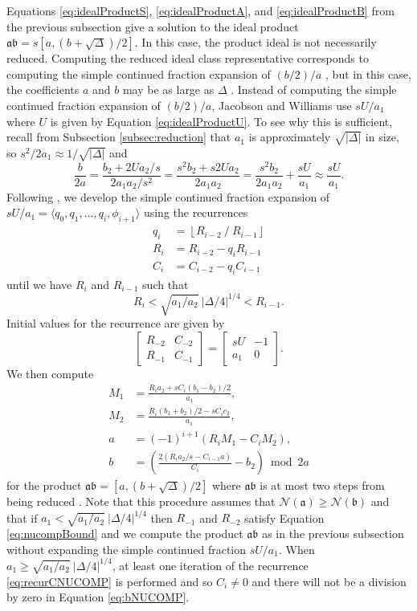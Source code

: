 \documentclass{ucalgthes1}
\theoremstyle{definition}
\newcommand{\matrixtt}[4]{\left[ \begin{array}{rr} #1 & #2 \\ #3 & #4 \end{array} \right]}
\newcommand{\floor}[1]{\left\lfloor #1 \right\rfloor}
\newcommand{\ideal}{\mathfrak}
\begin{document}
Equations \ref{eq:idealProductS}, \ref{eq:idealProductA}, and \ref{eq:idealProductB} from the previous subsection give a solution to the ideal product $\ideal a \ideal b = s[a, (b+\sqrt\Delta)/2]$.  In this case, the product ideal is not necessarily reduced.  Computing the reduced ideal class representative corresponds to computing the simple continued fraction expansion of $(b/2)/a$ \cite[p.119]{Jacobson2009}, but in this case, the coefficients $a$ and $b$ may be as large as $\Delta$ \cite[p.118]{Jacobson2009}.  Instead of computing the simple continued fraction expansion of $(b/2)/a$, Jacobson and Williams \cite[p.119]{Jacobson2009} use $sU/a_1$ where $U$ is given by Equation \ref{eq:idealProductU}.  To see why this is sufficient, recall from Subsection \ref{subsec:reduction} that $a_1$ is approximately $\sqrt{|\Delta|}$ in size, so $s^2 / 2 a_1 \approx 1 / \sqrt{|\Delta|}$ and
\[
	\frac{b}{2a} = \frac{b_2 + 2Ua_2/s}{2a_1a_2/s^2} 
	= \frac{s^2 b_2+s2Ua_2}{2a_1a_2}
	= \frac{s^2b_2}{2a_1a_2} + \frac{sU}{a_1}
	\approx \frac{sU}{a_1}.
\]
Following \cite[pp.120-121]{Jacobson2009}, we develop the simple continued fraction expansion of $sU/a_1 = \langle q_0, q_1, \dots, q_i, \phi_{i+1} \rangle$ using the recurrences
\begin{align}
	q_i &= \floor{R_{i-2} ~/~ R_{i-1}} \label{eq:recurqNUCOMP} \\
	R_i &= R_{i-2} - q_i R_{i-1} \label{eq:recurRNUCOMP} \\
	C_i &= C_{i-2} - q_i C_{i-1} \label{eq:recurCNUCOMP}
\end{align}
until we have $R_i$ and $R_{i-1}$ such that
\begin{equation}
\label{eq:nucompBound}
	R_i < \sqrt{a_1/a_2} ~ |\Delta/4|^{1/4} < R_{i-1}.
\end{equation}
Initial values for the recurrence are given by
\[
	\matrixtt{R_{-2}}{C_{-2}}{R_{-1}}{C_{-1}} = \matrixtt{sU}{-1}{a_1}{0}.
\]
We then compute
\begin{align}
	M_1 &= \frac{R_i a_2 + sC_i(b_1-b_2)/2}{a_1}, \nonumber \\
	M_2 &= \frac{R_i (b_1+b_2)/2 - s C_i c_2}{a_1}, \nonumber \\
	a &= (-1)^{i+1} (R_i M_1  - C_i M_2), \nonumber \\
	b &= \left( \frac{2(R_i a_2 /s - C_{i-1} a)}{C_i} - b_2 \right) \bmod 2a \label{eq:bNUCOMP}
\end{align}
for the product $\mathfrak a \mathfrak b = [a, (b + \sqrt\Delta)/2]$ where $\ideal a \ideal b$ is at most two steps from being reduced \cite[p.122]{Jacobson2009}.  Note that this procedure assumes that $\mathcal N(\mathfrak a) \ge \mathcal N(\mathfrak b)$ and that if $a_1 < \sqrt{a_1/a_2} ~ |\Delta/4|^{1/4}$ then $R_{-1}$ and $R_{-2}$ satisfy Equation \ref{eq:nucompBound} and we compute the product $\mathfrak a \mathfrak b$ as in the previous subsection without expanding the simple continued fraction $sU/a_1$.  When $a_1 \ge \sqrt{a_1/a_2} ~ |\Delta/4|^{1/4}$, at least one iteration of the recurrence \ref{eq:recurCNUCOMP} is performed and so $C_i \neq 0$ and there will not be a division by zero in Equation \ref{eq:bNUCOMP}.
\end{document}
